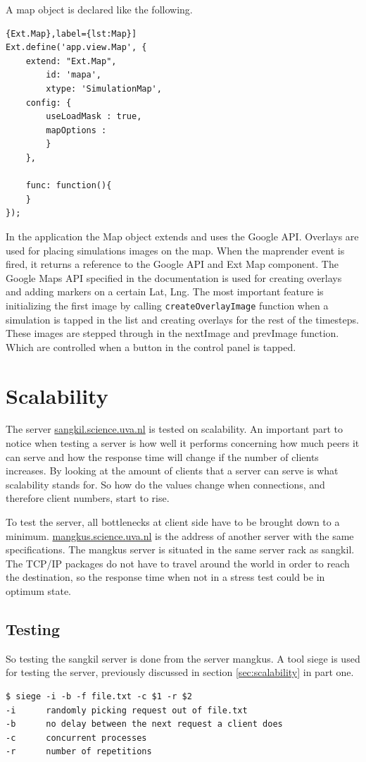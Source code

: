 A map object is declared like the following.
\begin{lstlisting}{Ext.Map},label={lst:Map}]
Ext.define('app.view.Map', {
	extend: "Ext.Map",
		id: 'mapa',
		xtype: 'SimulationMap',
	config: {
		useLoadMask : true,
		mapOptions : 
		}
	},
	
	func: function(){
	}
});	
\end{lstlisting}
In the application the Map object extends and uses the Google API. Overlays are used for placing simulations images on the map. When the maprender event is fired, it returns a reference to the Google API and Ext Map component. The Google Maps API specified in the documentation is used for creating overlays and adding markers on a certain Lat, Lng. The most important feature is initializing the first image by calling \texttt{createOverlayImage} function when a simulation is tapped in the list and creating overlays for the rest of the timesteps. These images are stepped through in the nextImage and prevImage function. Which are controlled when a button in the control panel is tapped. 
\section{Scalability}
The server \url{sangkil.science.uva.nl} is tested on scalability. An important part to notice when testing a server is how well it performs concerning how much peers it can serve and how the response time will change if the number of clients increases. By looking at the amount of clients that a server can serve is what scalability stands for. So how do the values change when connections, and therefore client numbers, start to rise.

To test the server, all bottlenecks at client side have to be brought down to a minimum. \url{mangkus.science.uva.nl} is the address of another server with the same specifications. The mangkus server is situated in the same server rack as sangkil. The TCP/IP packages do not have to travel around the world in order to reach the destination, so the response time when not in a stress test could be in optimum state. 

\subsection{Testing}
So testing the sangkil server is done from the server mangkus. A tool siege is used for testing the server, previously discussed in section \ref{sec:scalability} in part one.
\begin{lstlisting}
$ siege -i -b -f file.txt -c $1 -r $2
-i		randomly picking request out of file.txt
-b		no delay between the next request a client does
-c		concurrent processes
-r		number of repetitions
\end{lstlisting}


